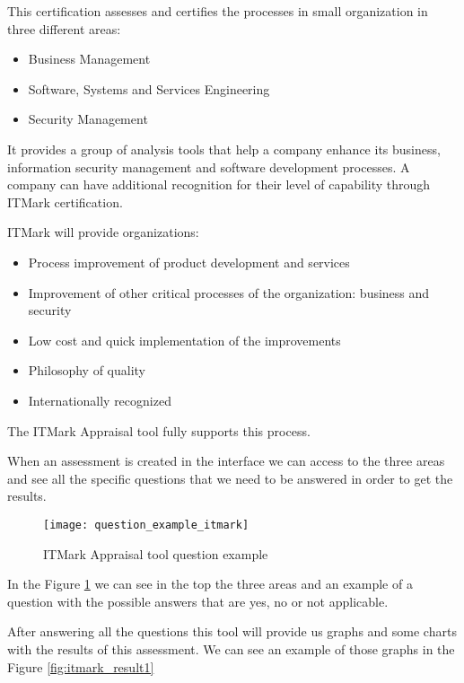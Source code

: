 This certification assesses and certifies the processes in small organization in three different areas:
\begin{itemize}
	\item Business Management
	\item Software, Systems and Services Engineering
	\item Security Management
\end{itemize}

It provides a group of analysis tools that help a company enhance its business, information security management and software development processes. A company can have additional recognition for their level of capability through ITMark certification.

ITMark will provide organizations:
\begin{itemize}
	\item Process improvement of product development and services
	\item Improvement of other critical processes of the organization: business and security
	\item Low cost and quick implementation of the improvements
	\item Philosophy of quality
	\item Internationally recognized
\end{itemize}

The ITMark Appraisal tool fully supports this process.


When an assessment is created in the interface we can access to the three areas and see all the specific questions that we need to be answered in order to get the results.

\begin{figure}[h]
	\begin{center}
		\leavevmode
		\texttt{[image: question\_example\_itmark]}
		\caption{ITMark Appraisal tool question example}
		\label{fig:itmark_question}
	\end{center}
\end{figure}

In the Figure \ref{fig:itmark_question} we can see in the top the three areas and an example of a question with the possible answers that are yes, no or not applicable.

After answering all the questions this tool will provide us graphs and some charts with the results of this assessment. We can see an example of those graphs in the Figure \ref{fig:itmark_result1}

